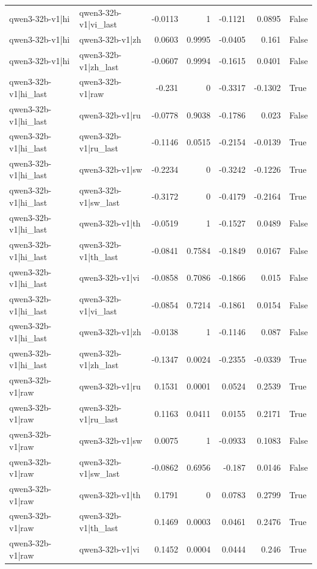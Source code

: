 \begin{table}
\begin{tabular}{l l r r r r l}
qwen3-32b-v1|hi & qwen3-32b-v1|vi_last & -0.0113 & 1 & -0.1121 & 0.0895 & False \\
qwen3-32b-v1|hi & qwen3-32b-v1|zh & 0.0603 & 0.9995 & -0.0405 & 0.161 & False \\
qwen3-32b-v1|hi & qwen3-32b-v1|zh_last & -0.0607 & 0.9994 & -0.1615 & 0.0401 & False \\
qwen3-32b-v1|hi_last & qwen3-32b-v1|raw & -0.231 & 0 & -0.3317 & -0.1302 & True \\
qwen3-32b-v1|hi_last & qwen3-32b-v1|ru & -0.0778 & 0.9038 & -0.1786 & 0.023 & False \\
qwen3-32b-v1|hi_last & qwen3-32b-v1|ru_last & -0.1146 & 0.0515 & -0.2154 & -0.0139 & True \\
qwen3-32b-v1|hi_last & qwen3-32b-v1|sw & -0.2234 & 0 & -0.3242 & -0.1226 & True \\
qwen3-32b-v1|hi_last & qwen3-32b-v1|sw_last & -0.3172 & 0 & -0.4179 & -0.2164 & True \\
qwen3-32b-v1|hi_last & qwen3-32b-v1|th & -0.0519 & 1 & -0.1527 & 0.0489 & False \\
qwen3-32b-v1|hi_last & qwen3-32b-v1|th_last & -0.0841 & 0.7584 & -0.1849 & 0.0167 & False \\
qwen3-32b-v1|hi_last & qwen3-32b-v1|vi & -0.0858 & 0.7086 & -0.1866 & 0.015 & False \\
qwen3-32b-v1|hi_last & qwen3-32b-v1|vi_last & -0.0854 & 0.7214 & -0.1861 & 0.0154 & False \\
qwen3-32b-v1|hi_last & qwen3-32b-v1|zh & -0.0138 & 1 & -0.1146 & 0.087 & False \\
qwen3-32b-v1|hi_last & qwen3-32b-v1|zh_last & -0.1347 & 0.0024 & -0.2355 & -0.0339 & True \\
qwen3-32b-v1|raw & qwen3-32b-v1|ru & 0.1531 & 0.0001 & 0.0524 & 0.2539 & True \\
qwen3-32b-v1|raw & qwen3-32b-v1|ru_last & 0.1163 & 0.0411 & 0.0155 & 0.2171 & True \\
qwen3-32b-v1|raw & qwen3-32b-v1|sw & 0.0075 & 1 & -0.0933 & 0.1083 & False \\
qwen3-32b-v1|raw & qwen3-32b-v1|sw_last & -0.0862 & 0.6956 & -0.187 & 0.0146 & False \\
qwen3-32b-v1|raw & qwen3-32b-v1|th & 0.1791 & 0 & 0.0783 & 0.2799 & True \\
qwen3-32b-v1|raw & qwen3-32b-v1|th_last & 0.1469 & 0.0003 & 0.0461 & 0.2476 & True \\
qwen3-32b-v1|raw & qwen3-32b-v1|vi & 0.1452 & 0.0004 & 0.0444 & 0.246 & True \\

\end{tabular}
\end{table}
